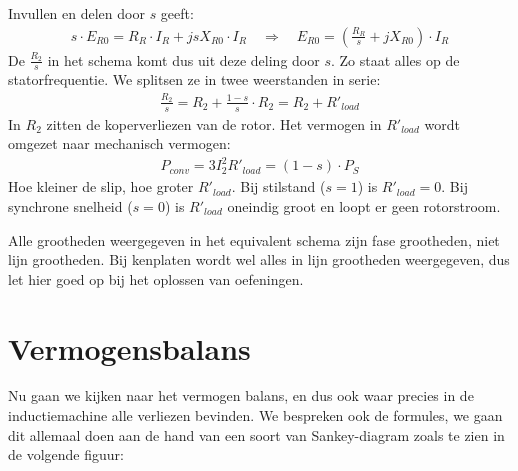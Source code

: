 Invullen en delen door $s$ geeft:
\begin{align*}
    s \cdot E_{R0} = R_R \cdot I_R + j s X_{R0} \cdot I_R \quad\Rightarrow\quad E_{R0} = \left(\frac{R_R}{s} + jX_{R0}\right) \cdot I_R
\end{align*}
De $\frac{R_2}{s}$ in het schema komt dus uit deze deling door $s$. Zo staat alles op de
statorfrequentie. We splitsen ze in twee weerstanden in serie:
\begin{align*}
   \frac{R_2}{s} = R_2 + \frac{1-s}{s} \cdot R_2 = R_2 + R'_{load}
\end{align*}
In $R_2$ zitten de koperverliezen van de rotor. Het vermogen in $R'_{load}$ wordt omgezet naar
mechanisch vermogen:
\begin{align*}
    P_{conv} = 3 I_2^2 R'_{load} = (1-s) \cdot P_S
\end{align*}
Hoe kleiner de slip, hoe groter $R'_{load}$. Bij stilstand ($s = 1$) is $R'_{load} = 0$. Bij
synchrone snelheid ($s = 0$) is $R'_{load}$ oneindig groot en loopt er geen rotorstroom.

\begin{warningbox}
    Alle grootheden weergegeven in het equivalent schema zijn fase grootheden, niet lijn
    grootheden.
    Bij kenplaten wordt wel alles in lijn grootheden weergegeven, dus let hier goed op bij
    het oplossen van oefeningen.
\end{warningbox}

\section{Vermogensbalans}
Nu gaan we kijken naar het vermogen balans, en dus ook waar precies in de inductiemachine
alle verliezen bevinden.
We bespreken ook de formules, we gaan dit allemaal doen aan de hand van een soort van
Sankey-diagram zoals te zien in de volgende figuur:

